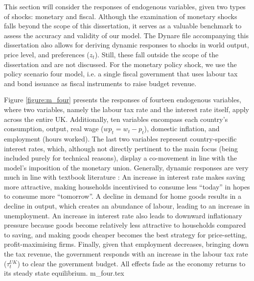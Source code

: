 This section will consider the responses of endogenous variables, given two types of shocks: monetary and fiscal. Although the examination of monetary shocks falls beyond the scope of this dissertation, it serves as a valuable benchmark to assess the accuracy and validity of our model. The Dynare file accompanying this dissertation also allows for deriving dynamic responses to shocks in world output, price level, and preferences ($z_t$). Still, these fall outside the scope of the dissertation and are not discussed. For the monetary policy shock, we use the policy scenario four model, i.e. a single fiscal government that uses labour tax and bond issuance as fiscal instruments to raise budget revenue.

Figure \ref{figure:m_four} presents the responses of fourteen endogenous variables, where two variables, namely the labour tax rate and the interest rate itself, apply across the entire UK. Additionally, ten variables encompass each country's consumption, output, real wage ($wp_t = w_t - p_t$), domestic inflation, and employment (hours worked). The last two variables represent country-specific interest rates, which, although not directly pertinent to the main focus (being included purely for technical reasons), display a co-movement in line with the model's imposition of the monetary union. Generally, dynamic responses are very much in line with textbook literature \parencite[243]{jordigal_2015_monetary}: An increase in interest rate makes saving more attractive, making households incentivised to consume less ``today'' in hopes to consume more ``tomorrow''. A decline in demand for home goods results in a decline in output, which creates an abundance of labour, leading to an increase in unemployment. An increase in interest rate also leads to downward inflationary pressure because goods become relatively less attractive to households compared to saving, and making goods cheaper becomes the best strategy for price-setting, profit-maximising firms. Finally, given that employment decreases, bringing down the tax revenue, the government responds with an increase in the labour tax rate ($\tau^{UK}_t$) to clear the government budget. All effects fade as the economy returns to its steady state equilibrium.
{m_four.tex}

